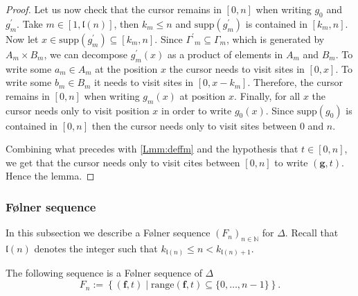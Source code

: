 \documentclass[english, 11pt, a4paper]{article}
\theoremstyle{definition}
\numberwithin{equation}{section}
\newcommand{\bN}{\mathbb{N}}
\newcommand{\mbff}{\boldsymbol{f}}
\newcommand{\mbfg}{\boldsymbol{g}}
\newcommand{\Gsp}{{\Gamma^\prime}_m}
\newcommand{\BZ}{\Delta}
\newcommand{\range}{\mathrm{range}}
\newcommand{\supp}{\mathrm{supp}}
\newcommand{\landing}{\mathfrak{l}}
\begin{document}
\begin{proof}
  Let us now check that the cursor
  remains in $[0,n]$ when writing $g_0$ and $g^{\prime}_m$.
  Take $m\in [1,\landing(n)]$, then $k_m\leq n$ and $\supp(g^\prime_m)$ is
  contained in $[k_m,n]$. Now let $x \in \supp(g^\prime_m)\subseteq [k_m,n]$.
  Since $\Gsp \subseteq \Gamma_m$, which is generated by $A_m \times
  B_m$, we can decompose $g^\prime_m(x)$ as a product of elements in $A_m$ and
  $B_m$. To write some $a_m\in A_m$ at the position $x$ the cursor needs to
  visit sites in $[0,x]$. To write some $b_m\in B_m$ it needs to visit sites in
  $[0,x-k_m]$. Therefore, the cursor remains in $[0,n]$ when writing $g_m(x)$ at
  position $x$. 
  Finally, for all $x$
  the cursor needs only to visit position $x$ in order to write $g_0(x)$. Since
  $\supp(g_0)$ is contained in $[0,n]$ then the cursor needs only to visit sites
  between $0$ and $n$.

  Combining what precedes with \cref{Lmm:deffm} and the hypothesis that $t\in
  [0,n]$, we get that the cursor needs only
  to visit cites between $[0,n]$ to write $(\mbfg,t)$.
  Hence the lemma.
\end{proof}

\subsubsection{Følner sequence}\label{Subsec:FolnerSequence}
In this subsection we describe a Følner sequence $(F_n)_{n\in \bN}$ for $\BZ$.
Recall that $\landing(n)$ denotes the integer such that $k_{\landing(n)}\leq n <
k_{\landing(n)+1}$.

\begin{Prop} \label{Prop:FolnerSequence}
  The following sequence is a Følner sequence of $\BZ$
  \begin{equation*}
    F_n:= \left\{ \left(\mbff, t \right) \mid 
       \range \left( \mbff,t\right) \subseteq \{0, \ldots, n-1\} \right\}.
  \end{equation*}
\end{Prop}
\end{document}
